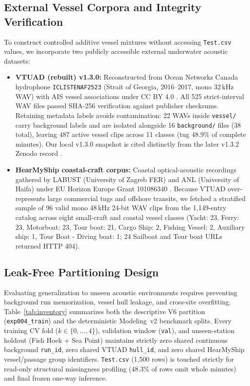 \documentclass[10pt,a4paper]{article}
\begin{document}
\subsection{External Vessel Corpora and Integrity Verification}
To construct controlled additive vessel mixtures without accessing \texttt{Test.csv} values, we incorporate two publicly accessible external underwater acoustic datasets:
\begin{itemize}
    \item \textbf{VTUAD (rebuilt) v1.3.0:} Reconstructed from Ocean Networks Canada hydrophone \texttt{ICLISTENAF2523} (Strait of Georgia, 2016--2017, mono 32\,kHz WAV) with AIS vessel associations under CC BY 4.0 \parencite{yuan2026vtuad,onc2026oceans}. All 525 strict-interval WAV files passed SHA-256 verification against publisher checksums. Retaining metadata labels avoids contamination: 22 WAVs inside \texttt{vessel/} carry background labels and are isolated alongside 16 \texttt{background/} files (38 total), leaving 487 active vessel clips across 11 classes (tug 48.9\% of complete minutes). Our local v1.3.0 snapshot is cited distinctly from the later v1.3.2 Zenodo record \parencite{yuan2026vtuad132}.
    \item \textbf{HearMyShip coastal-craft corpus:} Coastal optical-acoustic recordings gathered by LABUST (University of Zagreb FER) and ANL (University of Haifa) under EU Horizon Europe Grant 101086340 \parencite{shipton2025hearmyship,hearmyship2025platform}. Because VTUAD over-represents large commercial tugs and offshore transits, we fetched a stratified sample of 96 valid mono 48\,kHz 24-bit WAV clips from the 1,149-entry catalog across eight small-craft and coastal vessel classes (Yacht: 23, Ferry: 23, Motorboat: 23, Tour boat: 21, Cargo Ship: 2, Fishing Vessel: 2, Auxiliary ship: 1, Tour Boat - Diving boat: 1; 24 Sailboat and Tour boat URLs returned HTTP 404).
\end{itemize}

\subsection{Leak-Free Partitioning Design}
Evaluating generalization to unseen acoustic environments requires preventing background run memorization, vessel hull leakage, and cross-site overfitting. Table~\ref{tab:inventory} summarizes both the descriptive V6 partition (\texttt{exp004\_train}) and the deterministic Modeling~v2 benchmark splits. Every training CV fold ($k \in \{0,\dots,4\}$), validation window (\texttt{val}), and unseen-station holdout (Fish Hoek + Sea Point) maintains strictly zero shared continuous background \texttt{run\_id}, zero shared VTUAD \texttt{hull\_id}, and zero shared HearMyShip vessel/passage group identifiers. \texttt{Test.csv} (1,500 rows) is touched strictly for read-only structural missingness profiling (48.3\% of rows omit whole minutes) and final frozen one-way inference.
\end{document}
